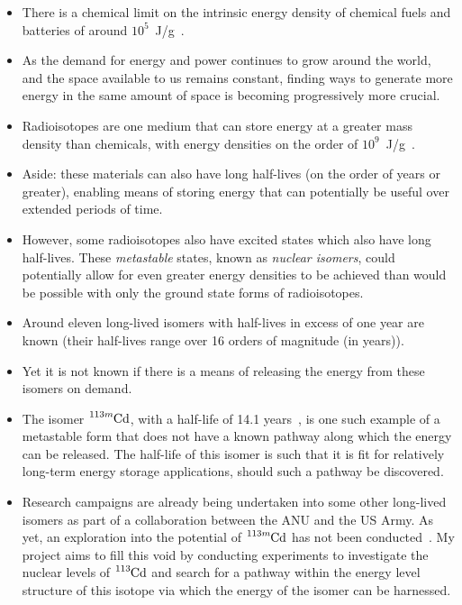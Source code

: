 \documentclass[12pt,a4paper]{article}
\begin{document}
\begin{itemize}
\item There is a chemical limit on the intrinsic energy density of chemical fuels and batteries of around $10^5$~J/g~\cite{shaffer_innovations_2018}. 
\item As the demand for energy and power continues to grow around the world, and the space available to us remains constant, finding ways to generate more energy in the same amount of space is becoming progressively more crucial. 
\item Radioisotopes are one medium that can store energy at a greater mass density than chemicals, with energy densities on the order of $10^9$~J/g~\cite{shaffer_innovations_2018}.
\item Aside: these materials can also have long half-lives (on the order of years or greater), enabling means of storing energy that can potentially be useful over extended periods of time. 
\item However, some radioisotopes also have excited states which also have long half-lives. These \textit{metastable} states, known as \textit{nuclear isomers}, could potentially allow for even greater energy densities to be achieved than would be possible with only the ground state forms of radioisotopes.
\item Around eleven long-lived isomers with half-lives in excess of one year are known (their half-lives range over 16 orders of magnitude (in years)).
\item Yet it is not known if there is a means of releasing the energy from these isomers on demand.
\item The isomer $\ce{^{113m}Cd}$, with a half-life of 14.1 years~\cite{shaffer_innovations_2018}, is one such example of a metastable form that does not have a known pathway along which the energy can be released. The half-life of this isomer is such that it is fit for relatively long-term energy storage applications, should such a pathway be discovered. 
\item Research campaigns are already being undertaken into some other long-lived isomers as part of a collaboration between the ANU and the US Army. As yet, an exploration into the potential of $\ce{^{113m}Cd}$ has not been conducted~\cite{shaffer_innovations_2018}. My project aims to fill this void by conducting experiments to investigate the nuclear levels of $\ce{^{113}Cd}$ and search for a pathway within the energy level structure of this isotope via which the energy of the isomer can be harnessed. 
\end{itemize}
\end{document}
